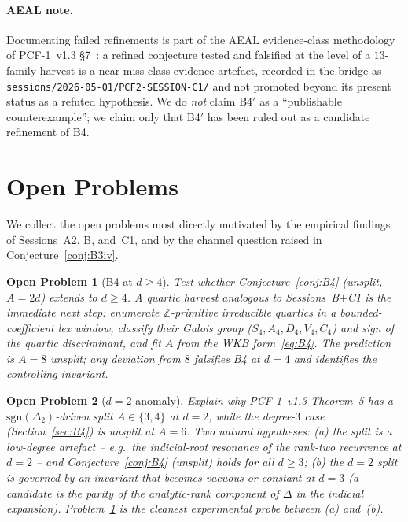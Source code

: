 \documentclass[11pt,a4paper]{article}
\newtheorem{problem}{Open Problem}
\theoremstyle{definition}
\theoremstyle{remark}
\newcommand{\Z}{\mathbb{Z}}
\begin{document}
\paragraph{AEAL note.}
Documenting failed refinements is part of the AEAL evidence-class
methodology of PCF-1~v1.3 \S 7~\cite{Papanokechi2026PCF1}: a refined
conjecture tested and falsified at the level of a $13$-family harvest
is a near-miss-class evidence artefact, recorded in the bridge as
\texttt{sessions/2026-05-01/PCF2-SESSION-C1/} and not promoted beyond
its present status as a refuted hypothesis. We do \emph{not} claim
B4$'$ as a ``publishable counterexample''; we claim only that
B4$'$ has been ruled out as a candidate refinement of B4.

\section{Open Problems}\label{sec:openproblems}

We collect the open problems most directly motivated by the
empirical findings of Sessions~A2, B, and~C1, and by the channel
question raised in Conjecture~\ref{conj:B3iv}.

\begin{problem}[B4 at $d\ge 4$]\label{op:b4-degree-d}
Test whether Conjecture~\ref{conj:B4} (unsplit, $A=2d$) extends to
$d\ge 4$. A quartic harvest analogous to Sessions~B$+$C1 is the
immediate next step: enumerate $\Z$-primitive irreducible quartics in
a bounded-coefficient lex window, classify their Galois group
($S_4, A_4, D_4, V_4, C_4$) and sign of the quartic discriminant, and
fit $A$ from the WKB form~\eqref{eq:B4}. The prediction is $A=8$
unsplit; any deviation from $8$ falsifies B4 at $d=4$ and identifies
the controlling invariant.
\end{problem}

\begin{problem}[$d=2$ anomaly]\label{op:d2-anomaly}
Explain why PCF-1~v1.3 Theorem~5 has a
$\mathrm{sgn}(\Delta_{2})$-driven split $A\in\{3,4\}$ at $d=2$, while
the degree-$3$ case (Section~\ref{sec:B4}) is \emph{unsplit} at
$A=6$. Two natural hypotheses:
(a) the split is a low-degree artefact -- e.g.\ the indicial-root
resonance of the rank-two recurrence at $d=2$ -- and
Conjecture~\ref{conj:B4} (unsplit) holds for all $d\ge 3$;
(b) the $d=2$ split is governed by an invariant that becomes vacuous
or constant at $d=3$ (a candidate is the parity of the analytic-rank
component of $\Delta$ in the indicial expansion). Problem~\ref{op:b4-degree-d}
is the cleanest experimental probe between (a) and~(b).
\end{problem}
\end{document}
